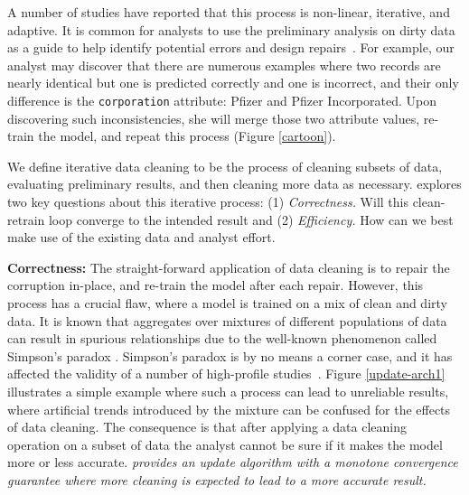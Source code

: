 A number of studies have reported that this process is non-linear, iterative, and adaptive.
It is common for analysts to use the preliminary analysis on dirty data as a guide to help identify potential errors and design repairs~\cite{kandel2012}.
For example, our analyst may discover that there are numerous examples where two records are nearly identical but one is predicted correctly and one is incorrect, and their only difference is the \texttt{corporation} attribute: Pfizer and Pfizer Incorporated.
Upon discovering such inconsistencies, she will merge those two attribute values, re-train the model, and repeat this process (Figure \ref{cartoon}).

We define iterative data cleaning to be the process of cleaning subsets of data, evaluating preliminary results, and then cleaning more data as necessary.
\sys explores two key questions about this iterative process: (1) \emph{Correctness.} Will this clean-retrain loop converge to the intended result and (2) \emph{Efficiency.} How can we best make use of the existing data and analyst effort.

\vspace{0.5em}
\noindent \textbf{Correctness: } The straight-forward application of data cleaning is to repair the corruption in-place, and re-train the model after each repair.
However, this process has a crucial flaw, where a model is trained on a mix of clean and dirty data.
It is known that aggregates over mixtures of different populations of data can result in spurious relationships due to the well-known phenomenon called Simpson's paradox \cite{simpson1951interpretation}.
Simpson's paradox is by no means a corner case, and it has affected the validity of a number of high-profile studies~\cite{pearl2003causality}.
Figure \ref{update-arch1} illustrates a simple example where such a process can lead to unreliable results, where artificial trends introduced by the mixture can be confused for the effects of data cleaning.
The consequence is that after applying a data cleaning operation on a subset of data the analyst cannot be sure if it makes the model more or less accurate.
\emph{\sys provides an update algorithm with a monotone convergence guarantee where more cleaning is expected to lead to a more accurate result.}

